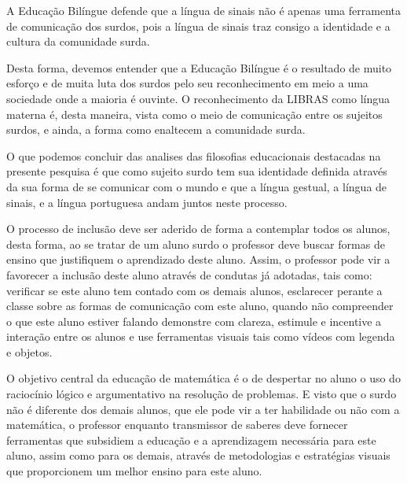 \documentclass[brasil]{abnt}
\begin{document}
	A Educação Bilíngue defende que a língua de sinais não é apenas uma ferramenta de comunicação dos surdos, pois a língua de sinais traz consigo a identidade e a cultura da comunidade surda. 
	
	Desta forma, devemos entender que a Educação Bilíngue é o resultado de muito esforço e de muita luta dos surdos pelo seu reconhecimento em meio a uma sociedade onde a maioria é ouvinte. O reconhecimento da
	LIBRAS como língua materna é, desta maneira, vista como o meio de comunicação entre os sujeitos surdos, e ainda, a forma como enaltecem a comunidade surda. 
	
	O que podemos concluir das analises das filosofias educacionais destacadas na presente pesquisa é que como sujeito surdo tem sua identidade definida através da sua forma de se comunicar com o mundo e que 
	a língua gestual, a língua de sinais, e a língua portuguesa andam juntos neste processo.     
	
	O processo de inclusão deve ser aderido de forma a contemplar todos os alunos, desta forma, ao se tratar de um aluno surdo o professor deve buscar formas de ensino que justifiquem o aprendizado deste aluno.
	Assim, o professor pode vir a favorecer a inclusão deste aluno através de condutas já adotadas, tais como: verificar se este aluno tem contado com os demais alunos, esclarecer perante a 
	classe sobre as formas de comunicação com este aluno, quando não compreender o que este aluno estiver falando demonstre com clareza, estimule e incentive a interação entre os alunos e use ferramentas 
	visuais tais como vídeos com legenda e objetos.        
	
	O objetivo central da educação de matemática é o de despertar no aluno o uso do raciocínio lógico e argumentativo na resolução de problemas. E visto que o surdo não é diferente dos demais alunos, que ele pode vir a 
	ter habilidade ou não com a matemática, o professor enquanto transmissor de saberes deve fornecer ferramentas que subsidiem a educação e a aprendizagem necessária para este aluno, assim como para os demais, através
	de metodologias e estratégias visuais que proporcionem um melhor ensino para este aluno. 
  
  

	\nocite{bev}
	\nocite{bot}
	\nocite{l1}
	\nocite{l2}
	\nocite{l3}
	\nocite{l4}
	\nocite{l5}
	\nocite{l6}
	\nocite{capo}
	\nocite{car}
	\nocite{cr}
	\nocite{Ubi}
	\nocite{dec}
	\nocite{fa}
	\nocite{gold}
	\nocite{lacerd}
	\nocite{lei}
	\nocite{lip}
	\nocite{machado}
	\nocite{PC}
	\nocite{macha}
	\nocite{mm}
	\nocite{mon}
	\nocite{nogu}
	\nocite{nunes}
	\nocite{oliveira}
	\nocite{Paul}
	\nocite{jur}
	\nocite{pei}
	\nocite{crist}
	\nocite{quas}
	\nocite{qua}
	\nocite{qep}
	\nocite{quads}
	\nocite{rodr}
	\nocite{sado}
	\nocite{Sales}
	\nocite{sal}
	\nocite{san}
	\nocite{sp}
	\nocite{ei}
	\nocite{silva}
	\nocite{soares}
	\nocite{sou}
    
\end{document}
